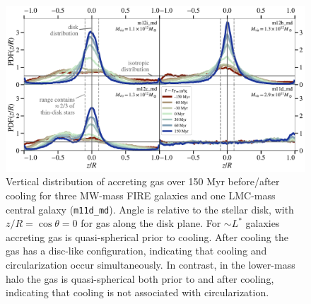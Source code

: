 \documentclass[fleqn,usenatbib]{mnras}
\begin{document}
\begin{figure}
    \centering
    \includegraphics[width=\textwidth]{figures/theta_vs_t.pdf}
    \caption{
    Vertical distribution of accreting gas over 150 Myr before/after cooling for three MW-mass FIRE galaxies and one LMC-mass central galaxy (\texttt{m11d\_md}).
    Angle is relative to the stellar disk, with $z/R = \cos\theta=0$ for gas along the disk plane.
    For $\sim L^*$ galaxies accreting gas is quasi-spherical prior to cooling.
    After cooling the gas has a disc-like configuration, indicating that cooling and circularization occur simultaneously. 
    In contrast, in the lower-mass halo the gas is quasi-spherical both prior to and after cooling, indicating that cooling is not associated with circularization.
    }
    \label{f: theta vs t}
\end{figure}
\end{document}
